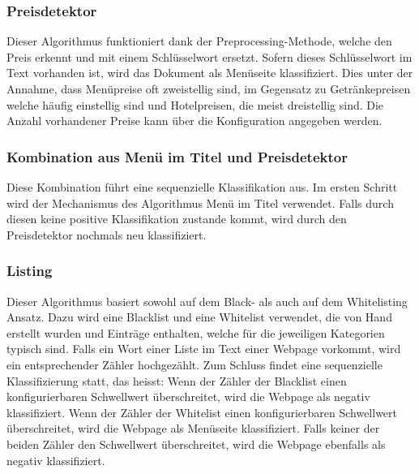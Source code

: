 \subsubsection{Preisdetektor}
Dieser Algorithmus funktioniert dank der Preprocessing-Methode, welche den Preis erkennt und mit einem Schlüsselwort ersetzt.
Sofern dieses Schlüsselwort im Text vorhanden ist, wird das Dokument als Menüseite klassifiziert. Dies unter der Annahme, dass Menüpreise oft zweistellig sind, im Gegensatz zu Getränkepreisen welche häufig einstellig sind und Hotelpreisen, die meist dreistellig sind.
Die Anzahl vorhandener Preise kann über die Konfiguration angegeben werden.
\subsubsection{Kombination aus Menü im Titel und Preisdetektor}
Diese Kombination führt eine sequenzielle Klassifikation aus.
Im ersten Schritt wird der Mechanismus des Algorithmus \glqq Menü im Titel\grqq{} verwendet.
Falls durch diesen keine positive Klassifikation zustande kommt, wird durch den Preisdetektor nochmals neu klassifiziert.
\subsubsection{Listing}
Dieser Algorithmus basiert sowohl auf dem Black- als auch auf dem Whitelisting Ansatz.
Dazu wird eine Blacklist und eine Whitelist verwendet, die von Hand erstellt wurden und Einträge enthalten, welche für die jeweiligen Kategorien typisch sind.
Falls ein Wort einer Liste im Text einer Webpage vorkommt, wird ein entsprechender Zähler hochgezählt.
Zum Schluss findet eine sequenzielle Klassifizierung statt, das heisst: 
Wenn der Zähler der Blacklist einen konfigurierbaren Schwellwert überschreitet, wird die Webpage als negativ klassifiziert. 
Wenn der Zähler der Whitelist einen konfigurierbaren Schwellwert überschreitet, wird die Webpage als Menüseite klassifiziert.
Falls keiner der beiden Zähler den Schwellwert überschreitet, wird die Webpage ebenfalls als negativ klassifiziert. 
